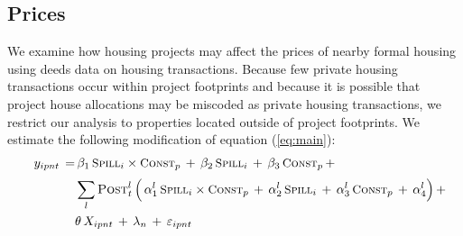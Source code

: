 \documentclass[12pt]{article}
\begin{document}






\subsection{Prices}\label{section:resultsprices}


We examine how housing projects may affect the prices of nearby formal housing using deeds data on housing transactions.  Because few private housing transactions occur within project footprints and because it is possible that project house allocations may be miscoded as private housing transactions, we restrict our analysis to properties located outside of project footprints.  We estimate the following modification of equation (\ref{eq:main}):
\begin{align}\label{eq:mainprice}
\begin{split}
\quad y_{ipnt} \, =&  \, \beta_1 \, \textsc{\small Spill}_{i}\times\textsc{\small Const}_{p} \, + \, \beta_2 \, \textsc{\small Spill}_{i} \, + \, \beta_3 \, \textsc{\small Const}_{p}\,+  \,  \\[.2em]
 &\sum_{l} \textsc{Post}^{l}_{t} \, \Big( \, \alpha_1^{l} \, \textsc{\small Spill}_{i}\times\textsc{\small Const}_{p} \, + \, \alpha_2^{l} \, \textsc{\small Spill}_{i} \, + \, \alpha_3^{l} \, \textsc{\small Const}_{p}\, +\, \alpha_4^{l} \Big) \, +  \,  \\
&\theta \, X_{ipnt} \, + \, \lambda_n \, + \, \varepsilon_{ipnt} \quad 
\end{split}
\end{align}
\end{document}
